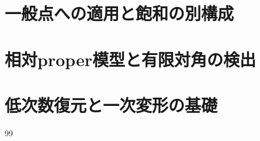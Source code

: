 \part{一般点への適用と飽和の別構成}







\part{相対proper模型と有限対角の検出}




\appendix
\part{低次数復元と一次変形の基礎}




\begin{thebibliography}{99}

\end{thebibliography}

